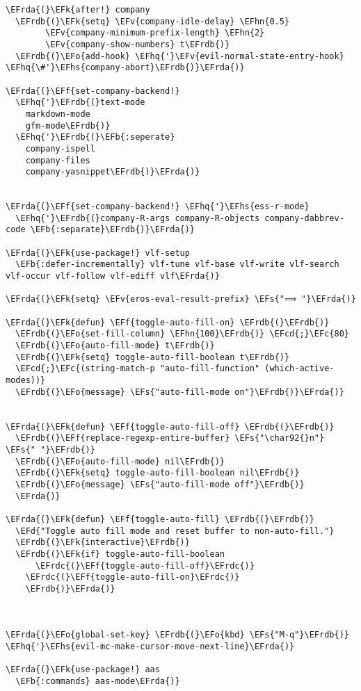 \documentclass[a4wide,10pt]{article}
\newcommand{\EFc}[1]{\textcolor{EFc}{#1}} %
\newcommand{\EFcd}[1]{\textcolor{EFcd}{#1}} %
\newcommand{\EFs}[1]{\textcolor{EFs}{#1}} %
\newcommand{\EFd}[1]{\textcolor{EFd}{#1}} %
\newcommand{\EFk}[1]{\textcolor{EFk}{#1}} %
\newcommand{\EFb}[1]{\textcolor{EFb}{#1}} %
\newcommand{\EFf}[1]{\textcolor{EFf}{#1}} %
\newcommand{\EFv}[1]{\textcolor{EFv}{#1}} %
\newcommand{\EFo}[1]{\textcolor{EFo}{#1}} %
\newcommand{\EFhn}[1]{\textcolor{EFhn}{\textbf{#1}}} %
\newcommand{\EFhq}[1]{\textcolor{EFhq}{#1}} %
\newcommand{\EFhs}[1]{\textcolor{EFhs}{#1}} %
\newcommand{\EFrda}[1]{\textcolor{EFrda}{#1}} %
\newcommand{\EFrdb}[1]{\textcolor{EFrdb}{#1}} %
\newcommand{\EFrdc}[1]{\textcolor{EFrdc}{#1}} %
\begin{document}
\begin{Code}
\begin{Verbatim}
\EFrda{(}\EFk{after!} company
  \EFrdb{(}\EFk{setq} \EFv{company-idle-delay} \EFhn{0.5}
        \EFv{company-minimum-prefix-length} \EFhn{2}
        \EFv{company-show-numbers} t\EFrdb{)}
  \EFrdb{(}\EFo{add-hook} \EFhq{'}\EFv{evil-normal-state-entry-hook} \EFhq{\#'}\EFhs{company-abort}\EFrdb{)}\EFrda{)}

\EFrda{(}\EFf{set-company-backend!}
  \EFhq{'}\EFrdb{(}text-mode
    markdown-mode
    gfm-mode\EFrdb{)}
  \EFhq{'}\EFrdb{(}\EFb{:seperate}
    company-ispell
    company-files
    company-yasnippet\EFrdb{)}\EFrda{)}


\EFrda{(}\EFf{set-company-backend!} \EFhq{'}\EFhs{ess-r-mode}
  \EFhq{'}\EFrdb{(}company-R-args company-R-objects company-dabbrev-code \EFb{:separate}\EFrdb{)}\EFrda{)}

\EFrda{(}\EFk{use-package!} vlf-setup
  \EFb{:defer-incrementally} vlf-tune vlf-base vlf-write vlf-search vlf-occur vlf-follow vlf-ediff vlf\EFrda{)}

\EFrda{(}\EFk{setq} \EFv{eros-eval-result-prefix} \EFs{"⟹ "}\EFrda{)}

\EFrda{(}\EFk{defun} \EFf{toggle-auto-fill-on} \EFrdb{(}\EFrdb{)}
  \EFrdb{(}\EFo{set-fill-column} \EFhn{100}\EFrdb{)} \EFcd{;}\EFc{80}
  \EFrdb{(}\EFo{auto-fill-mode} t\EFrdb{)}
  \EFrdb{(}\EFk{setq} toggle-auto-fill-boolean t\EFrdb{)}
  \EFcd{;}\EFc{(string-match-p "auto-fill-function" (which-active-modes))}
  \EFrdb{(}\EFo{message} \EFs{"auto-fill-mode on"}\EFrdb{)}\EFrda{)}


\EFrda{(}\EFk{defun} \EFf{toggle-auto-fill-off} \EFrdb{(}\EFrdb{)}
  \EFrdb{(}\EFf{replace-regexp-entire-buffer} \EFs{"\char92{}n"} \EFs{" "}\EFrdb{)}
  \EFrdb{(}\EFo{auto-fill-mode} nil\EFrdb{)}
  \EFrdb{(}\EFk{setq} toggle-auto-fill-boolean nil\EFrdb{)}
  \EFrdb{(}\EFo{message} \EFs{"auto-fill-mode off"}\EFrdb{)}
  \EFrda{)}

\EFrda{(}\EFk{defun} \EFf{toggle-auto-fill} \EFrdb{(}\EFrdb{)}
  \EFd{"Toggle auto fill mode and reset buffer to non-auto-fill."}
  \EFrdb{(}\EFk{interactive}\EFrdb{)}
  \EFrdb{(}\EFk{if} toggle-auto-fill-boolean
      \EFrdc{(}\EFf{toggle-auto-fill-off}\EFrdc{)}
    \EFrdc{(}\EFf{toggle-auto-fill-on}\EFrdc{)}
    \EFrdb{)}\EFrda{)}



\EFrda{(}\EFo{global-set-key} \EFrdb{(}\EFo{kbd} \EFs{"M-q"}\EFrdb{)} \EFhq{'}\EFhs{evil-mc-make-cursor-move-next-line}\EFrda{)}

\EFrda{(}\EFk{use-package!} aas
  \EFb{:commands} aas-mode\EFrda{)}


\end{Verbatim}
\end{Code}
\end{document}
